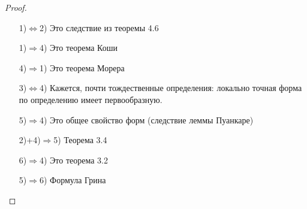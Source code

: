 \begin{proof}\thmslashn
	\begin{enumerate}
		\item[1)$\Leftrightarrow$2)]
		Это следствие из теоремы 4.6
		\item[1)$\Rightarrow$4)]
		Это теорема Коши
		\item[4)$\Rightarrow$1)]
		Это теорема Морера
		\item[3)$\Leftrightarrow$4)]
            Кажется, почти тождественные определения: локально точная форма по определению имеет первообразную.
		\item[5)$\Rightarrow$4)]
		Это общее свойство форм (следствие леммы Пуанкаре)
		\item[2)+4)$\Rightarrow$5)]
		Теорема 3.4
		\item[6)$\Rightarrow$4)]
		Это теорема 3.2
		\item[5)$\Rightarrow$6)]
		Формула Грина
		
	\end{enumerate}
	
\end{proof}